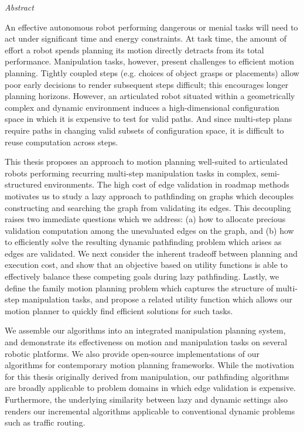 
\begin{fullwidth}
\begin{adjustwidth}{1in}{1in}

{\LARGE \emph{Abstract}}

\vspace{0.2in}

An effective autonomous robot performing dangerous or menial tasks
will need to act under significant time and energy constraints.
At task time,
the amount of effort a robot spends planning its motion directly
detracts from its total performance.
Manipulation tasks, however, present challenges
to efficient motion planning.
Tightly coupled steps (e.g. choices of object grasps or placements)
allow poor early decisions to render subsequent steps difficult;
this encourages longer planning horizons.
However,
an articulated robot
situated within a geometrically complex and dynamic environment
induces a high-dimensional configuration space
in which it is expensive to test for valid paths.
And since multi-step plans
require paths in changing valid subsets of configuration space,
it is difficult to reuse computation across steps.

\vspace{0.2cm}

This thesis proposes an approach to motion planning
well-suited to articulated robots
performing recurring multi-step manipulation tasks
in complex, semi-structured environments.
The high cost of edge validation in roadmap methods
motivates us to study a lazy approach to pathfinding on graphs
which decouples constructing and searching the graph
from validating its edges.
This decoupling raises two immediate questions which we address:
(a) how to allocate precious validation computation
among the unevaluated edges on the graph,
and (b) how to efficiently solve the resulting dynamic pathfinding
problem which arises as edges are validated.
We next consider the inherent tradeoff
between planning and execution cost,
and show that an objective based on utility functions
is able to effectively balance these competing goals
during lazy pathfinding.
Lastly,
we define the family motion planning problem
which captures the structure of multi-step manipulation tasks,
and propose a related utility function which allows our
motion planner to quickly find efficient solutions for such tasks.

\vspace{0.2cm}

We assemble our algorithms into an integrated manipulation planning
system,
and demonstrate its effectiveness on motion and manipulation tasks
on several robotic platforms.
We also provide open-source implementations of our algorithms
for contemporary motion planning frameworks.
While the motivation for this thesis originally derived
from manipulation,
our pathfinding algorithms are broadly applicable to problem domains
in which edge validation is expensive.
Furthermore,
the underlying similarity between lazy and dynamic settings
also renders our incremental algorithms applicable
to conventional dynamic problems such as traffic routing.


\end{adjustwidth}
\end{fullwidth}
